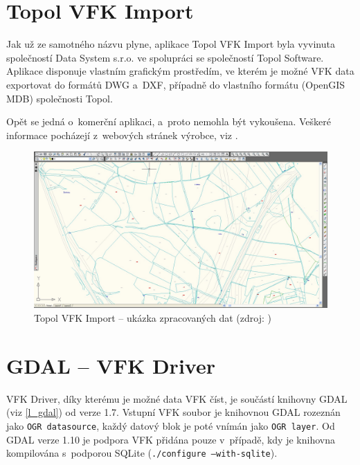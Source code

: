 \documentclass[a4paper,12pt,oneside]{book}
\begin{document}
\section{Topol VFK Import}
Jak už ze samotného názvu plyne, aplikace Topol VFK Import byla vyvinuta společností Data System s.r.o. ve spolupráci se společností Topol Software. Aplikace disponuje vlastním grafickým prostředím, ve kterém je možné VFK data exportovat do formátů DWG a~DXF, případně do vlastního formátu (OpenGIS MDB) společnosti Topol. 

Opět se jedná o~komerční aplikaci, a~proto nemohla být vykoušena. Veškeré informace pocházejí z~webových stránek výrobce, viz \cite{topol_vfk_import}.

\begin{figure}[htb]
\centering
\includegraphics[width=\textwidth]{images/topol-aplikace.png}
\caption[Topol VFK Import -- ukázka zpracovaných dat]{Topol VFK Import -- ukázka zpracovaných dat (zdroj: \cite{topol_vfk_import})}
\end{figure}

\newpage
\section{GDAL -- VFK Driver}
VFK Driver, díky kterému je možné data VFK číst, je součástí knihovny GDAL (viz \ref{l_gdal}) od verze 1.7. Vstupní VFK soubor je knihovnou GDAL rozeznán jako \texttt{OGR datasource}, každý datový blok je poté vnímán jako \texttt{OGR layer}. Od GDAL verze 1.10 je podpora VFK přidána pouze v~případě, kdy je knihovna kompilována s~podporou SQLite (\texttt{./configure --with-sqlite}).
\end{document}
